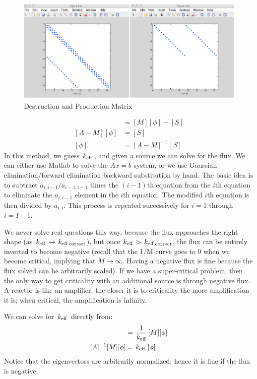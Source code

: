 \documentclass{school-22.211-notes}
\begin{document}
\begin{figure}[ht]
  \centering
  \includegraphics[width=6in]{images/dfs/matrix-form.png}
  \caption{Destruction and Production Matrix} \label{matrix-form}
\end{figure}

\begin{align}
[A] [\phi] &= [M] [\phi] + [S] \\
[A - M ] [\phi] &= [S] \\
[\phi] &= [A - M]^{-1} [S]
\end{align}
In this method, we guess $\left. k_{\mathrm{eff}} \right.$, and given a source we can solve for the flux. We can either use Matlab to solve the $Ax = b$ system, or we use Gaussian elimination/forward elimination backward substitution by hand. The basic idea is to subtract $a_{i,i-1}/a_{i-1,i-1}$ times the $(i-1)$th equation from the $i$th equation to eliminate the $a_{i,i-1}$ element in the $i$th equation. The modified $i$th equation is then divided by $a_{i,i}$. This process is repeated successively for $i=1$ through $i = I-1$. 

We never solve real questions this way, because the flux approaches the right shape (as $\left. k_{\mathrm{eff}} \right. \to \left. k_{\mathrm{eff}} \right._{\mathrm{correct}}$), but once $\left. k_{\mathrm{eff}} \right. > \left. k_{\mathrm{eff}} \right._{\mathrm{correct}}$, the flux can be entirely inverted to become negative (recall that the 1/M curve goes to 0 when we become critical, implying that $M \to \infty$. Having a negative flux is fine because the flux solved can be arbitrarily scaled). If we have a super-critical problem, then the only way to get criticality with an additional source is through negative flux. A reactor is like an amplifier; the closer it is to criticality the more amplification it is; when critical, the amplification is infinity. 


We can solve for $\left. k_{\mathrm{eff}} \right.$ directly from: 
\begin{align}
[A] [\phi] &= \frac{1}{\keff} [M] [\phi] \\
[A]^{-1} [M] [\phi] &= \keff [\phi]
\end{align}
Notice that the eigenvectors are arbitrarily normalized; hence it is fine if the flux is negative. 
\end{document}
